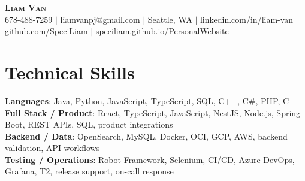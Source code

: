 \documentclass[letterpaper,11pt]{article}
\begin{document}

%
\begin{center}
    \textbf{\Huge \scshape Liam Van} \\ \vspace{1pt}
    \small 678-488-7259 $|$ \small {liamvanpj@gmail.com} $|$ Seattle, WA
 {{$|$ linkedin.com/in/liam-van} {$|$ github.com/SpeciLiam} {$|$ \href{https://speciliam.github.io/PersonalWebsite}{speciliam.github.io/PersonalWebsite}}}

\end{center}

\section{Technical Skills}
 \begin{itemize}[leftmargin=0.15in, label={}]
    \small{\item{
     \textbf{Languages}{: Java, Python, JavaScript, TypeScript, SQL, C++, C\#, PHP, C} \\
     \textbf{Full Stack / Product}{: React, TypeScript, JavaScript, NestJS, Node.js, Spring Boot, REST APIs, SQL, product integrations} \\
     \textbf{Backend / Data}{: OpenSearch, MySQL, Docker, OCI, GCP, AWS, backend validation, API workflows} \\
     \textbf{Testing / Operations}{: Robot Framework, Selenium, CI/CD, Azure DevOps, Grafana, T2, release support, on-call response} \\
    }}
 \end{itemize}
%
\end{document}

